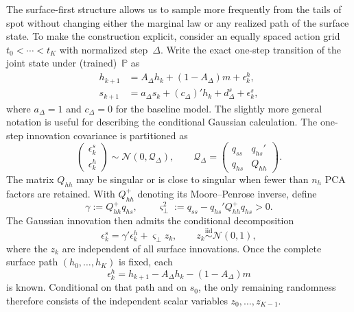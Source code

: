 \documentclass[11pt,a4paper]{article}
\renewcommand{\P}{\mathbb{P}}
\begin{document}
The surface-first structure allows us to sample more frequently from the tails
of spot without changing either the marginal law or any realized path of the
surface state. To make the construction explicit, consider an equally spaced
action grid $t_0<\cdots<t_K$ with normalized step~$\Delta$. Write the exact
one-step transition of the joint state under (trained)~$\P$ as
\begin{equation}\label{eq:importance_joint_transition}
\begin{split}
    h_{k+1}&=A_\Delta h_k+(1-A_\Delta) m+\epsilon_k^h,\\
    s_{k+1}&=a_\Delta s_k+(c_\Delta)'h_k+d_\Delta^s+\epsilon_k^s,
\end{split}
\end{equation}
where $a_\Delta=1$ and $c_\Delta=0$ for the baseline model. The slightly more
general notation is useful for describing the conditional Gaussian
calculation. The one-step innovation covariance is partitioned as
\begin{equation}\label{eq:importance_covariance_blocks}
    \begin{pmatrix}\epsilon_k^s\\ \epsilon_k^h\end{pmatrix}
    \sim\mathcal N\!\left(
        0,
        \mathcal Q_\Delta
    \right),
    \qquad
    \mathcal Q_\Delta=
    \begin{pmatrix}
        q_{ss} & q_{hs}'\\
        q_{hs} & Q_{hh}
    \end{pmatrix}.
\end{equation}
The matrix $Q_{hh}$ may be singular or is close to singular when fewer than $n_h$ PCA factors are
retained. With $Q_{hh}^{+}$ denoting its Moore--Penrose inverse, define
\begin{equation}\label{eq:importance_conditional_innovation}
    \gamma:=Q_{hh}^{+}q_{hs},
    \qquad
    \varsigma_\perp^2
    :=q_{ss}-q_{hs}'Q_{hh}^{+}q_{hs}>0.
\end{equation}
The Gaussian innovation then admits the conditional decomposition
\begin{equation}\label{eq:importance_spot_decomposition}
    \epsilon_k^s=\gamma'\epsilon_k^h+\varsigma_\perp z_k,
    \qquad z_k\overset{\mathrm{iid}}\sim\mathcal N(0,1),
\end{equation}
where the $z_k$ are independent of all surface innovations. Once the complete
surface path $(h_0,\ldots,h_K)$ is fixed, each
\[
    \epsilon_k^h=h_{k+1}-A_\Delta h_k-(1-A_\Delta) m
\]
is known. Conditional on that path and on $s_0$, the only remaining randomness
therefore consists of the independent scalar variables $z_0,\ldots,z_{K-1}$.
\end{document}
